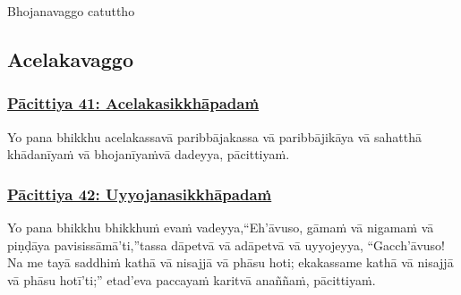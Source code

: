 \begin{center}
	Bhojanavaggo catuttho
\end{center}



\subsection{Acelakavaggo}

\subsubsection*{\hyperref[exp41]{Pācittiya 41: Acelakasikkhāpadaṁ}}
\label{pac41}

Yo pana bhikkhu acelakassa\makeatletter\hyperlink{endnote309-appendix}\makeatother \thinspace vā paribbājakassa vā paribbājikāya vā sahatthā khādanīyaṁ vā bhojanīyaṁ\makeatletter\hyperlink{endnote310-appendix}\makeatother \thinspace vā dadeyya, pācittiyaṁ.



\subsubsection*{\hyperref[exp42]{Pācittiya 42: Uyyojanasikkhāpadaṁ}}
\label{pac42}

Yo pana bhikkhu bhikkhuṁ evaṁ vadeyya,\makeatletter\hyperlink{endnote311-appendix}\makeatother \thinspace ``Eh'āvuso, gāmaṁ vā nigamaṁ vā piṇḍāya pavisissāmā'ti,''\makeatletter\hyperlink{endnote312-appendix}\makeatother \thinspace tassa dāpetvā vā adāpetvā vā uyyojeyya, ``Gacch'āvuso! Na me tayā saddhiṁ kathā vā nisajjā vā phāsu hoti; ekakassa\makeatletter\hyperlink{endnote313-appendix}\makeatother \thinspace me kathā vā nisajjā vā phāsu hotī'ti;'' etad'eva paccayaṁ karitvā anaññaṁ, pācittiyaṁ.



